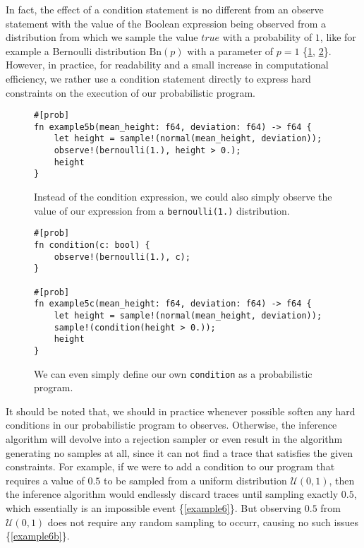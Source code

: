 In fact, the effect of a condition statement is no different from an observe statement with the value of the Boolean expression being observed from a distribution from which we sample the value $true$ with a probability of $1$, like for example a Bernoulli distribution $\text{Bn}(p)$ with a parameter of $p=1$ \{\ref{example5b}, \ref{example5c}\}. However, in practice, for readability and a small increase in computational efficiency, we rather use a condition statement directly to express hard constraints on the execution of our probabilistic program.

\begin{figure}[h]
\begin{lstlisting}
#[prob]
fn example5b(mean_height: f64, deviation: f64) -> f64 {
    let height = sample!(normal(mean_height, deviation));
    observe!(bernoulli(1.), height > 0.);
    height
}
\end{lstlisting}
\caption{Instead of the condition expression, we could also simply observe the value of our expression from a \lstinline{bernoulli(1.)} distribution.}
\label{example5b}
\end{figure}

\begin{figure}[h]
\begin{lstlisting}
#[prob]
fn condition(c: bool) {
    observe!(bernoulli(1.), c);
}

#[prob]
fn example5c(mean_height: f64, deviation: f64) -> f64 {
    let height = sample!(normal(mean_height, deviation));
    sample!(condition(height > 0.));
    height
}
\end{lstlisting}
\caption{We can even simply define our own \lstinline{condition} as a probabilistic program.}
\label{example5c}
\end{figure}

It should be noted that, we should in practice whenever possible soften any hard conditions in our probabilistic program to observes. Otherwise, the inference algorithm will devolve into a rejection sampler or even result in the algorithm generating no samples at all, since it can not find a trace that satisfies the given constraints. For example, if we were to add a condition to our program that requires a value of $0.5$ to be sampled from a uniform distribution $\mathcal{U}(0,1)$, then the inference algorithm would endlessly discard traces until sampling exactly $0.5$, which essentially is an impossible event \{\ref{example6}\}. But observing $0.5$ from $\mathcal{U}(0,1)$ does not require any random sampling to occurr, causing no such issues \{\ref{example6b}\}.

